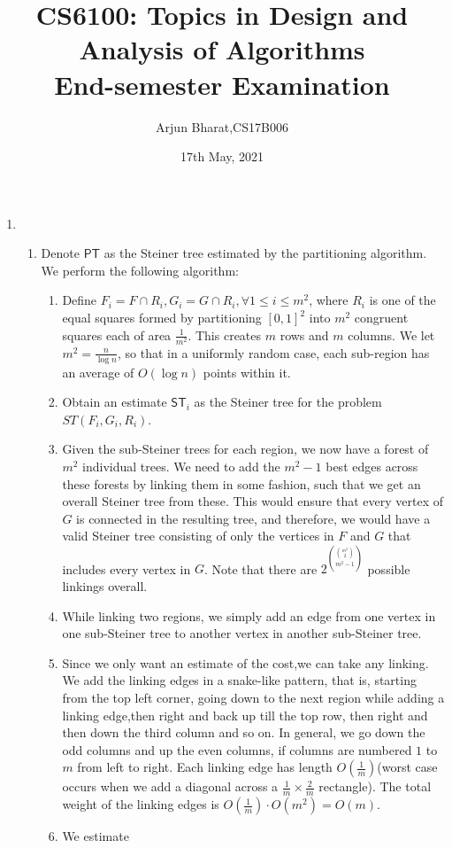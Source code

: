 \documentclass{article}
\author{Arjun Bharat,CS17B006}
\title{CS6100: Topics in Design and Analysis of Algorithms \\ End-semester Examination}
\date{17th May, 2021}
\newcommand{\cc}[1]{\mathsf{#1}}
\begin{document}
	\maketitle
	\begin{enumerate}
		\item \begin{enumerate}
			\item Denote $\cc{PT}$ as the Steiner tree estimated by the partitioning algorithm. We perform the following algorithm:
			\begin{enumerate}
				\item Define $F_i = F \cap R_i,G_i = G \cap R_i, \forall 1 \leq i \leq m^2$, where $R_i$ is one of the equal squares formed by partitioning ${[0,1]}^2$ into $m^2$ congruent squares each of area $\frac{1}{m^2}$. This creates $m$ rows and $m$ columns. We let $m^2 = \frac{n}{\log n}$, so that in a uniformly random case, each sub-region has an average of $O(\log n)$ points within it.
				\item Obtain an estimate $\cc{ST}_i$ as the Steiner tree for the problem  $ST(F_i,G_i,R_i)$.
				\item Given the sub-Steiner trees for each region, we now have a forest of $m^2$ individual trees. We need to add the $m^2-1$ best edges across these forests by linking them in some fashion, such that we get an overall Steiner tree from these. This would ensure that every vertex of $G$ is connected in the resulting tree, and therefore, we would have a valid Steiner tree consisting of only the vertices in $F$ and $G$ that includes every vertex in $G$. Note that there are $2^{\binom{\binom{m^2}{2}}{m^2-1}}$ possible linkings overall.
				\item While linking two regions, we simply add an edge from one vertex in one sub-Steiner tree to another vertex in another sub-Steiner tree.  
				\item Since we only want an estimate of the cost,we can take any linking. We add the linking edges in a snake-like pattern, that is, starting from the top left corner, going down to the next region while adding a linking edge,then right and back up till the top row, then right and then down the third column and so on. In general, we go down the odd columns and up the even columns, if columns are numbered $1$ to $m$ from left to right. Each linking edge has length $O(\frac{1}{m})$(worst case occurs when we add a diagonal across a $\frac{1}{m} \times \frac{2}{m}$ rectangle). The total weight of the linking edges is $O(\frac{1}{m})\cdot O(m^2) = O(m)$.
				\item We estimate 
				

\end{enumerate}
\end{enumerate}
\end{enumerate}
\end{document}
